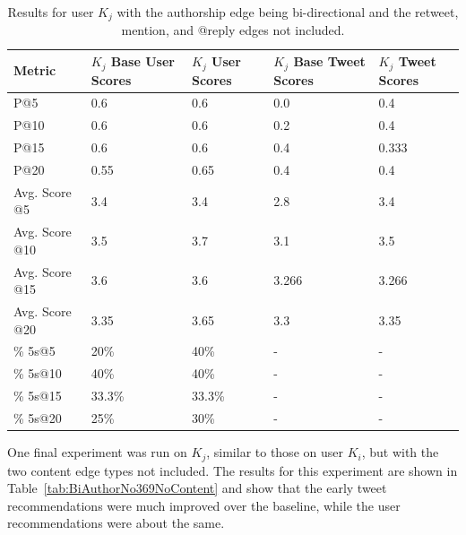 \begin{table}
\centering
\begin{tabular}{l|p{2.2cm}|p{2.2cm}|p{2.2cm}|p{2.2cm}}
{\bf Metric} & {\bf $K_{j}$ Base User Scores} & {\bf $K_{j}$ User Scores} & {\bf $K_{j}$ Base Tweet Scores} & {\bf $K_{j}$ Tweet Scores} \\ \hline
P@5   & 0.6 & 0.6 & 0.0 & 0.4 \\ \hline
P@10 & 0.6 & 0.6 & 0.2 & 0.4 \\ \hline
P@15 & 0.6 & 0.6 & 0.4 & 0.333 \\ \hline
P@20 & 0.55 & 0.65 & 0.4 & 0.4 \\ \hline

Avg. Score @5   & 3.4 & 3.4 & 2.8 & 3.4 \\ \hline
Avg. Score @10 & 3.5 & 3.7 & 3.1 & 3.5 \\ \hline
Avg. Score @15 & 3.6 & 3.6 & 3.266 & 3.266 \\ \hline
Avg. Score @20 & 3.35 & 3.65 & 3.3 & 3.35 \\ \hline

\% 5s@5    & 20\% & 40\% & - & - \\ \hline
\% 5s@10  & 40\% & 40\% & - & - \\ \hline
\% 5s@15  & 33.3\% & 33.3\% & - & - \\ \hline
\% 5s@20  & 25\% & 30\% & - & - \\

\end{tabular}
\caption{Results for user $K_{j}$ with the authorship edge being bi-directional and the retweet, mention, and @reply edges not included.}
\label{tab:BiAuthorNo369Kj}
\end{table}

One final experiment was run on $K_{j}$, similar to those on user $K_{i}$, but with the two content edge types not included. The results for this experiment are shown in Table~\ref{tab:BiAuthorNo369NoContent} and show that the early tweet recommendations were much improved over the baseline, while the user recommendations were about the same.


